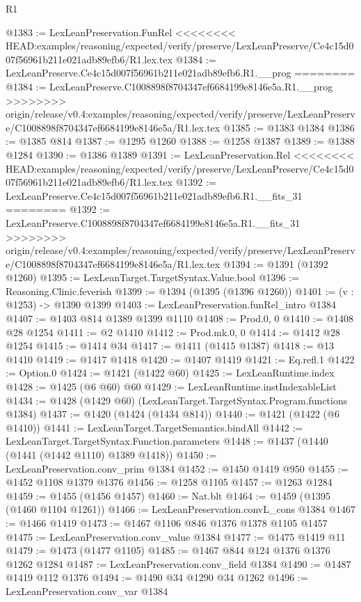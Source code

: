\begin{lexlean}{R1}
\begin{coremodule}
{{{{{{{{{{{{{{{{{{{{{{{{{{{{{{{{{{{{{{{{{{{{{{{{{{{{{{{{{{{{{{{{{{{{{{{{{{{{{{{{{{{{{{{{{{@1383 := LexLeanPreservation.FunRel
<<<<<<<< HEAD:examples/reasoning/expected/verify/preserve/LexLeanPreserve/Ce4c15d007f56961b211e021adb89efb6/R1.lex.tex
@1384 := LexLeanPreserve.Ce4c15d007f56961b211e021adb89efb6.R1.__prog
========
@1384 := LexLeanPreserve.C1008898f8704347ef6684199e8146e5a.R1.__prog
>>>>>>>> origin/release/v0.4:examples/reasoning/expected/verify/preserve/LexLeanPreserve/C1008898f8704347ef6684199e8146e5a/R1.lex.tex
@1385 := @1383 @1384
@1386 := @1385 @814
@1387 := @1295 @1260
@1388 := @1258 @1387
@1389 := @1388 @1284
@1390 := @1386 @1389
@1391 := LexLeanPreservation.Rel
<<<<<<<< HEAD:examples/reasoning/expected/verify/preserve/LexLeanPreserve/Ce4c15d007f56961b211e021adb89efb6/R1.lex.tex
@1392 := LexLeanPreserve.Ce4c15d007f56961b211e021adb89efb6.R1.__fits_31
========
@1392 := LexLeanPreserve.C1008898f8704347ef6684199e8146e5a.R1.__fits_31
>>>>>>>> origin/release/v0.4:examples/reasoning/expected/verify/preserve/LexLeanPreserve/C1008898f8704347ef6684199e8146e5a/R1.lex.tex
@1394 := @1391 (@1392 @1260)
@1395 := LexLeanTarget.TargetSyntax.Value.bool
@1396 := Reasoning.Clinic.feverish
@1399 := @1394 (@1395 (@1396 @1260))
@1401 := (v : @1253) -> @1390 @1399
@1403 := LexLeanPreservation.funRel_intro @1384
@1407 := @1403 @814 @1389 @1399 @1110
@1408 := Prod.{0, 0}
@1410 := @1408 @28 @1254
@1411 := @2 @1410
@1412 := Prod.mk.{0, 0}
@1414 := @1412 @28 @1254
@1415 := @1414 @34
@1417 := @1411 (@1415 @1387)
@1418 := @13 @1410
@1419 := @1417 @1418
@1420 := @1407 @1419
@1421 := Eq.refl.{1}
@1422 := Option.{0}
@1424 := @1421 (@1422 @60)
@1425 := LexLeanRuntime.index
@1428 := @1425 (@6 @60) @60
@1429 := LexLeanRuntime.instIndexableList
@1434 := @1428 (@1429 @60) (LexLeanTarget.TargetSyntax.Program.functions @1384)
@1437 := @1420 (@1424 (@1434 @814))
@1440 := @1421 (@1422 (@6 @1410))
@1441 := LexLeanTarget.TargetSemantics.bindAll
@1442 := LexLeanTarget.TargetSyntax.Function.parameters
@1448 := @1437 (@1440 (@1441 (@1442 @1110) @1389 @1418))
@1450 := LexLeanPreservation.conv_prim @1384
@1452 := @1450 @1419 @950
@1455 := @1452 @1108 @1379 @1376
@1456 := @1258 @1105
@1457 := @1263 @1284
@1459 := @1455 (@1456 @1457)
@1460 := Nat.blt
@1464 := @1459 (@1395 (@1460 @1104 @1261))
@1466 := LexLeanPreservation.convL_cons @1384
@1467 := @1466 @1419
@1473 := @1467 @1106 @846 @1376 @1378 @1105 @1457
@1475 := LexLeanPreservation.conv_value @1384
@1477 := @1475 @1419 @11
@1479 := @1473 (@1477 @1105)
@1485 := @1467 @844 @124 @1376 @1376 @1262 @1284
@1487 := LexLeanPreservation.conv_field @1384
@1490 := @1487 @1419 @112 @1376
@1494 := @1490 @34 @1290 @34 @1262
@1496 := LexLeanPreservation.conv_var @1384
}}}}}}}}}}}}}}}}}}}}}}}}}}}}}}}}}}}}}}}}}}}}}}}}}}}}}}}}}}}}}}}}}}}}}}}}}}}}}}}}}}}}}}}}}}
\end{coremodule}
\end{lexlean}
